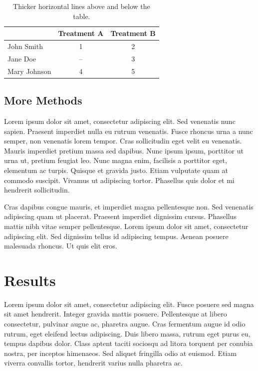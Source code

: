 \documentclass[double,12pt]{beavtex}
\begin{document}
\begin{table}[ht]
\centering
\caption{Thicker horizontal lines above and below the table.}
\begin{tabular}[t]{lcc}
\toprule
&Treatment A&Treatment B\\
\midrule
John Smith&1&2\\
Jane Doe&--&3\\
Mary Johnson&4&5\\
\bottomrule
\end{tabular}
\end{table}%


\section{More Methods}

Lorem ipsum dolor sit amet, consectetur adipiscing elit. Sed venenatis nunc sapien. Praesent imperdiet nulla eu rutrum venenatis. Fusce rhoncus urna a nunc semper, non venenatis lorem tempor. Cras sollicitudin eget velit eu venenatis. Mauris imperdiet pretium massa sed dapibus. Nunc ipsum ipsum, porttitor ut urna ut, pretium feugiat leo. Nunc magna enim, facilisis a porttitor eget, elementum ac turpis. Quisque et gravida justo. Etiam vulputate quam at commodo suscipit. Vivamus ut adipiscing tortor. Phasellus quis dolor et mi hendrerit sollicitudin. 

Cras dapibus congue mauris, et imperdiet magna pellentesque non. Sed venenatis adipiscing quam ut placerat. Praesent imperdiet dignissim cursus. Phasellus mattis nibh vitae semper pellentesque. Lorem ipsum dolor sit amet, consectetur adipiscing elit. Sed dignissim tellus id adipiscing tempus. Aenean posuere malesuada rhoncus. Ut quis elit eros.



\chapter{Results}

Lorem ipsum dolor sit amet, consectetur adipiscing elit. Fusce posuere sed magna sit amet hendrerit. Integer gravida mattis posuere. Pellentesque at libero consectetur, pulvinar augue ac, pharetra augue. Cras fermentum augue id odio rutrum, eget eleifend lectus adipiscing. Duis libero massa, rutrum eget purus eu, tempus dapibus dolor. Class aptent taciti sociosqu ad litora torquent per conubia nostra, per inceptos himenaeos. Sed aliquet fringilla odio at euismod. Etiam viverra convallis tortor, hendrerit varius nulla pharetra ac. 
\end{document}
